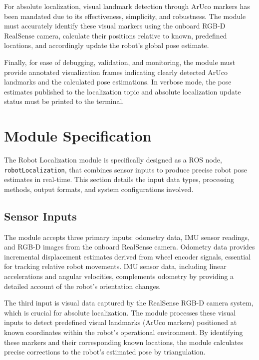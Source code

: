 \documentclass{CSSRforAfrica}
\begin{document}
For absolute localization, visual landmark detection through ArUco markers has been mandated due to its effectiveness, simplicity, and robustness. The module must accurately identify these visual markers using the onboard RGB-D RealSense camera, calculate their positions relative to known, predefined locations, and accordingly update the robot’s global pose estimate.

Finally, for ease of debugging, validation, and monitoring, the module must provide annotated visualization frames indicating clearly detected ArUco landmarks and the calculated pose estimations. In verbose mode, the pose estimates published to the localization topic and absolute localization update status must be printed to the terminal.

\newpage

\section{Module Specification}

The Robot Localization module is specifically designed as a ROS node, \texttt{robotLocalization}, that combines sensor inputs to produce precise robot pose estimates in real-time. This section details the input data types, processing methods, output formats, and system configurations involved.

\subsection*{Sensor Inputs}

The module accepts three primary inputs: odometry data, IMU sensor readings, and RGB-D images from the onboard RealSense camera. Odometry data provides incremental displacement estimates derived from wheel encoder signals, essential for tracking relative robot movements. IMU sensor data, including linear accelerations and angular velocities, complements odometry by providing a detailed account of the robot's orientation changes.

The third input is visual data captured by the RealSense RGB-D camera system, which is crucial for absolute localization. The module processes these visual inputs to detect predefined visual landmarks (ArUco markers) positioned at known coordinates within the robot’s operational environment. By identifying these markers and their corresponding known locations, the module calculates precise corrections to the robot’s estimated pose by triangulation.
\end{document}
